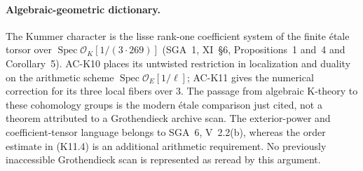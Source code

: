 \paragraph{Algebraic-geometric dictionary.}
The Kummer character is the lisse rank-one coefficient system
of the finite \'etale torsor over
$\operatorname{Spec}\mathcal O_K[1/(3\cdot269)]$ (SGA~1,
XI~\S6, Propositions~1 and~4 and Corollary~5).  AC-K10 places
its untwisted restriction in localization and duality on the
arithmetic scheme $\operatorname{Spec}\mathcal O_E[1/\ell]$;
AC-K11 gives the numerical correction for its three local
fibers over $3$.  The passage from algebraic K-theory to these
cohomology groups is the modern \'etale comparison just cited,
not a theorem attributed to a Grothendieck archive scan.
The exterior-power and coefficient-tensor language belongs to
SGA~6, V~2.2(b), whereas the order estimate in (K11.4) is an
additional arithmetic requirement.  No previously inaccessible
Grothendieck scan is represented as reread by this argument.
